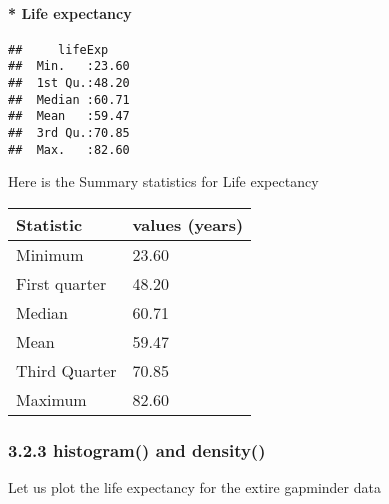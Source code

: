 \documentclass[]{article}
\newenvironment{Shaded}{\begin{snugshade}}{\end{snugshade}}
\newcommand{\KeywordTok}[1]{\textcolor[rgb]{0.13,0.29,0.53}{\textbf{{#1}}}}
\newcommand{\DataTypeTok}[1]{\textcolor[rgb]{0.13,0.29,0.53}{{#1}}}
\newcommand{\DecValTok}[1]{\textcolor[rgb]{0.00,0.00,0.81}{{#1}}}
\newcommand{\StringTok}[1]{\textcolor[rgb]{0.31,0.60,0.02}{{#1}}}
\newcommand{\CommentTok}[1]{\textcolor[rgb]{0.56,0.35,0.01}{\textit{{#1}}}}
\newcommand{\NormalTok}[1]{{#1}}
\let\oldparagraph\paragraph
\renewcommand{\paragraph}[1]{\oldparagraph{#1}\mbox{}}
\begin{document}
\paragraph{\texorpdfstring{* \textbf{Life
expectancy}}{* Life expectancy}}\label{life-expectancy}

\begin{Shaded}
\end{Shaded}

\begin{verbatim}
##     lifeExp     
##  Min.   :23.60  
##  1st Qu.:48.20  
##  Median :60.71  
##  Mean   :59.47  
##  3rd Qu.:70.85  
##  Max.   :82.60
\end{verbatim}

Here is the Summary statistics for Life expectancy

\begin{longtable}[]{@{}ll@{}}
\toprule
Statistic & values (years)\tabularnewline
\midrule
\endhead
Minimum & 23.60\tabularnewline
First quarter & 48.20\tabularnewline
Median & 60.71\tabularnewline
Mean & 59.47\tabularnewline
Third Quarter & 70.85\tabularnewline
Maximum & 82.60\tabularnewline
\bottomrule
\end{longtable}

\subsubsection{\texorpdfstring{3.2.3 \textbf{histogram()} and
\textbf{density()}}{3.2.3 histogram() and density()}}\label{histogram-and-density}

Let us plot the life expectancy for the extire gapminder data

\begin{Shaded}
\end{Shaded}
\end{document}
